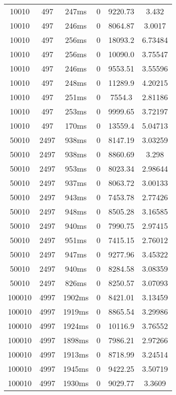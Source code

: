 \documentclass[./main.tex]{subfiles}
\begin{document}
\begin{table}
\begin{tabular}{ c | c | c | c | c | c }
        10010 & 497 & 247ms & 0 & 9220.73 & 3.432 \\
        10010 & 497 & 246ms & 0 & 8064.87 & 3.0017 \\
        10010 & 497 & 256ms & 0 & 18093.2 & 6.73484 \\
        10010 & 497 & 256ms & 0 & 10090.0 & 3.75547 \\
        10010 & 497 & 246ms & 0 & 9553.51 & 3.55596 \\
        10010 & 497 & 248ms & 0 & 11289.9 & 4.20215 \\
        10010 & 497 & 251ms & 0 & 7554.3 & 2.81186 \\
        \rowcolor{lightgray} 10010 & 497 & 253ms & 0 & 9999.65 & 3.72197 \\
        10010 & 497 & 170ms & 0 & 13559.4 & 5.04713 \\
        \hline
        \rowcolor{lightgray} 50010 & 2497 & 938ms & 0 & 8147.19 & 3.03259 \\
        50010 & 2497 & 938ms & 0 & 8860.69 & 3.298 \\
        50010 & 2497 & 953ms & 0 & 8023.34 & 2.98644 \\
        50010 & 2497 & 937ms & 0 & 8063.72 & 3.00133 \\
        50010 & 2497 & 943ms & 0 & 7453.78 & 2.77426 \\
        50010 & 2497 & 948ms & 0 & 8505.28 & 3.16585 \\
        50010 & 2497 & 940ms & 0 & 7990.75 & 2.97415 \\
        50010 & 2497 & 951ms & 0 & 7415.15 & 2.76012 \\
        50010 & 2497 & 947ms & 0 & 9277.96 & 3.45322 \\
        50010 & 2497 & 940ms & 0 & 8284.58 & 3.08359 \\
        50010 & 2497 & 826ms & 0 & 8250.57 & 3.07093 \\
        \hline
        100010 & 4997 & 1902ms & 0 & 8421.01 & 3.13459 \\
        100010 & 4997 & 1919ms & 0 & 8865.54 & 3.29986 \\
        100010 & 4997 & 1924ms & 0 & 10116.9 & 3.76552 \\
        100010 & 4997 & 1898ms & 0 & 7986.21 & 2.97266 \\
        100010 & 4997 & 1913ms & 0 & 8718.99 & 3.24514 \\
        100010 & 4997 & 1945ms & 0 & 9422.25 & 3.50719 \\
        100010 & 4997 & 1930ms & 0 & 9029.77 & 3.3609 \\

\end{tabular}
\end{table}
\end{document}
